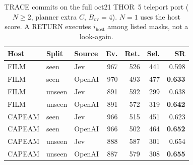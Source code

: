 \begin{table}[t]
\centering
\caption{TRACE commits on the full oct21 THOR~5 teleport port ($N\ge 2$, planner extra $C$, $B_{\mathrm{ov}}{=}4$).
$N{=}1$ uses the host score. A RETURN executes $i_{\mathrm{host}}$ among listed masks, not a look-again.}
\label{tab:select}
\scriptsize
\setlength{\tabcolsep}{3pt}
\begin{tabular}{lllrrrr}
\toprule
Host & Split & Source & Ev. & Ret. & Sel. & SR \\
\midrule
FILM & seen & Jev & 967 & 526 & 441 & 0.598 \\
FILM & seen & OpenAI & 970 & 493 & 477 & \textbf{0.633} \\
FILM & unseen & Jev & 891 & 592 & 299 & 0.638 \\
FILM & unseen & OpenAI & 891 & 572 & 319 & \textbf{0.642} \\
\midrule
CAPEAM & seen & Jev & 966 & 515 & 451 & 0.623 \\
CAPEAM & seen & OpenAI & 966 & 502 & 464 & \textbf{0.652} \\
CAPEAM & unseen & Jev & 888 & 587 & 301 & 0.654 \\
CAPEAM & unseen & OpenAI & 887 & 579 & 308 & \textbf{0.655} \\
\bottomrule
\end{tabular}
\end{table}
